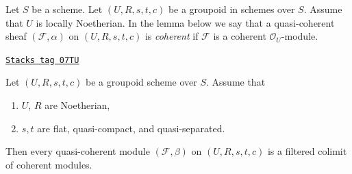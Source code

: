 Let $S$ be a scheme. Let $(U, R, s, t, c)$ be a groupoid in schemes over $S$.
Assume that $U$ is locally Noetherian. In the lemma below we say that a
quasi-coherent sheaf $(\mathcal{F}, \alpha)$ on $(U, R, s, t, c)$ is
{\it coherent} if $\mathcal{F}$ is a coherent $\mathcal{O}_U$-module.

\begin{lemma}
\label{groupoids-lemma-colimit-coherent}
\href{https://stacks.math.columbia.edu/tag/07TU}{\texttt{Stacks tag 07TU}}

Let $(U, R, s, t, c)$ be a groupoid scheme over $S$.
Assume that
\begin{enumerate}
\item $U$, $R$ are Noetherian,
\item $s, t$ are flat, quasi-compact, and quasi-separated.
\end{enumerate}
Then every quasi-coherent module $(\mathcal{F}, \beta)$ on $(U, R, s, t, c)$
is a filtered colimit of coherent modules.
\end{lemma}

